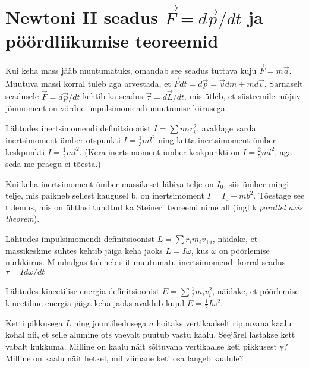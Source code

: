 \documentclass[a4paper,11pt,twocolumn]{article}
\begin{document}
\section{Newtoni II seadus $ \vec{F}=d\vec{p}/dt $ ja pöördliikumise teoreemid}
Kui keha mass jääb muutumatuks, omandab see seadus tuttava kuju $ \vec{F}=m\vec{a} $. Muutuva massi korral tuleb aga arvestada, et $ \vec{F}dt=d\vec{p}=\vec{v}dm+md\vec{v} $. Sarnaselt seadusele $ \vec{F}=d\vec{p}/dt $ kehtib ka seadus $ \vec{\tau}=d\vec{L}/dt $, mis ütleb, et süsteemile mõjuv jõumoment on võrdne impulsimomendi muutumise kiirusega.
\begin{question}
	Lähtudes inertsimomendi definitsioonist $ I=\sum m_i r_i^2 $, avaldage varda inertsimoment ümber otspunkti $ I=\frac{1}{3}ml^2 $ ning ketta inertsimoment ümber keskpunkti $ I=\frac{1}{2}ml^2 $. (Kera inertsimoment ümber keskpunkti on $ I=\frac{2}{5}ml^2 $, aga seda me praegu ei tõesta.)
\end{question}
\begin{question}
	Kui keha inertsimoment ümber massikeset läbiva telje on $ I_0 $, siis ümber mingi telje, mis paikneb sellest kaugusel b, on inertsimoment $ I=I_0+mb^2 $. Tõestage see tulemus, mis on ühtlasi tundtud ka Steineri teoreemi nime all (ingl k \textit{parallel axis theorem}).
\end{question}
\begin{question}
Lähtudes impulsimomendi definitsioonist $ L=\sum r_im_iv_{\bot i} $, näidake, et massikeskme suhtes kehtib jäiga keha jaoks $ L=I\omega $, kus $ \omega $ on pöörlemise nurkkiirus. Muuhulgas tuleneb siit muutumatu inertsimomendi korral seadus $ \tau =Id\omega/dt$
\end{question}
\begin{question}
	Lähtudes kineetilise energia definitsioonist $ E=\sum \frac{1}{2}m_i v_i^{2}$, näidake, et pöörlemise kineetiline energia jäiga keha jaoks avaldub kujul $ E=\frac{1}{2}I\omega^{2} $.
\end{question}
\begin{question}
	Ketti pikkusega $ L $ ning joontihedusega $ \sigma $ hoitaks vertikaalselt rippuvana kaalu kohal nii, et selle alumine ots vaevalt puutub vastu kaalu. Seejärel lastakse kett vabalt kukkuma. Milline on kaalu näit sõltuvana vertikaalse keti pikkusest y? Milline on kaalu näit hetkel, mil viimane keti osa langeb kaalule?
\end{question}
\end{document}
